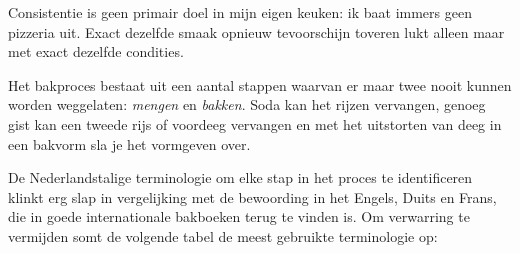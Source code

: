 \documentclass[
  11pt,
  dutch,
]{memoir}
\begin{document}
Consistentie is geen primair doel in mijn eigen keuken: ik baat immers
geen pizzeria uit. Exact dezelfde smaak opnieuw tevoorschijn toveren
lukt alleen maar met exact dezelfde condities.

Het bakproces bestaat uit een aantal stappen waarvan er maar twee nooit
kunnen worden weggelaten: \emph{mengen} en \emph{bakken}. Soda kan het
rijzen vervangen, genoeg gist kan een tweede rijs of voordeeg vervangen
en met het uitstorten van deeg in een bakvorm sla je het vormgeven over.

De Nederlandstalige terminologie om elke stap in het proces te
identificeren klinkt erg slap in vergelijking met de bewoording in het
Engels, Duits en Frans, die in goede internationale bakboeken terug te
vinden is. Om verwarring te vermijden somt de volgende tabel de meest
gebruikte terminologie op:
\end{document}
